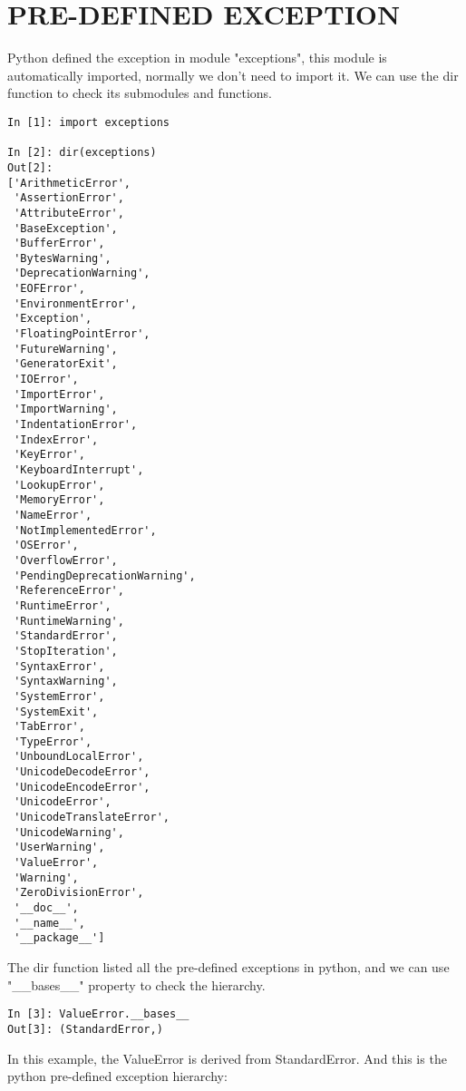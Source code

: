 \documentclass{article}
\begin{document}
\section{PRE-DEFINED EXCEPTION}
Python defined the exception in module "exceptions", this module is automatically imported, 
normally we don't need to import it. We can use the dir function to check its submodules and functions.
\begin{lstlisting}
In [1]: import exceptions

In [2]: dir(exceptions)
Out[2]: 
['ArithmeticError',
 'AssertionError',
 'AttributeError',
 'BaseException',
 'BufferError',
 'BytesWarning',
 'DeprecationWarning',
 'EOFError',
 'EnvironmentError',
 'Exception',
 'FloatingPointError',
 'FutureWarning',
 'GeneratorExit',
 'IOError',
 'ImportError',
 'ImportWarning',
 'IndentationError',
 'IndexError',
 'KeyError',
 'KeyboardInterrupt',
 'LookupError',
 'MemoryError',
 'NameError',
 'NotImplementedError',
 'OSError',
 'OverflowError',
 'PendingDeprecationWarning',
 'ReferenceError',
 'RuntimeError',
 'RuntimeWarning',
 'StandardError',
 'StopIteration',
 'SyntaxError',
 'SyntaxWarning',
 'SystemError',
 'SystemExit',
 'TabError',
 'TypeError',
 'UnboundLocalError',
 'UnicodeDecodeError',
 'UnicodeEncodeError',
 'UnicodeError',
 'UnicodeTranslateError',
 'UnicodeWarning',
 'UserWarning',
 'ValueError',
 'Warning',
 'ZeroDivisionError',
 '__doc__',
 '__name__',
 '__package__']
\end{lstlisting}
The dir function listed all the pre-defined exceptions in python, 
and we can use "\_\_bases\_\_" property to check the hierarchy.
\begin{lstlisting}
In [3]: ValueError.__bases__
Out[3]: (StandardError,)
\end{lstlisting}
In this example, the ValueError is derived from StandardError. 
And this is the python pre-defined exception hierarchy:
\end{document}
